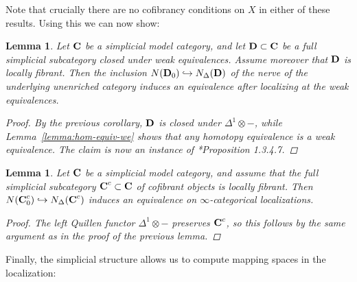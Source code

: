 \documentclass[reqno]{memo-l}
\theoremstyle{mythm}
\newtheorem{lemma}[thm]{Lemma}
\theoremstyle{definition}
\numberwithin{equation}{section}
\newcommand{\cat}[1]{\textbf{\textup{#1}}}
\begin{document}
Note that crucially there are no cofibrancy conditions on $X$ in either of these results. Using this we can now show:

\begin{lemma}\label{lemma:fgt-simpl-structure}
    Let $\cat{C}$ be a simplicial model category, and let $\cat{D}\subset\cat{C}$ be a full simplicial subcategory closed under weak equivalences. Assume moreover that $\cat{D}$ is locally fibrant. Then the inclusion $N(\cat{D}_0)\hookrightarrow N_\Delta(\cat{D})$ of the nerve of the underlying unenriched category induces an equivalence after localizing at the weak equivalences.
    \begin{proof}
        By the previous corollary, $\cat{D}$ is closed under $\Delta^1\otimes-$, while Lemma~\ref{lemma:hom-equiv-we} shows that any homotopy equivalence is a weak equivalence. The claim is now an instance of \cite{HA}*{Proposition 1.3.4.7}.
    \end{proof}
\end{lemma}

\begin{lemma}\label{lemma:fgt-simpl-structure-cof}
    Let $\cat{C}$ be a simplicial model category, and assume that the full simplicial subcategory $\cat{C}^c\subset\cat{C}$ of cofibrant objects is locally fibrant. Then $N(\cat{C}^c_0)\hookrightarrow N_\Delta(\cat{C}^c)$ induces an equivalence on $\infty$-categorical localizations.
    \begin{proof}
        The left Quillen functor $\Delta^1\otimes-$ preserves $\cat{C}^c$, so this follows by the same argument as in the proof of the previous lemma.
    \end{proof}
\end{lemma}

Finally, the simplicial structure allows us to compute mapping spaces in the localization:
\end{document}
